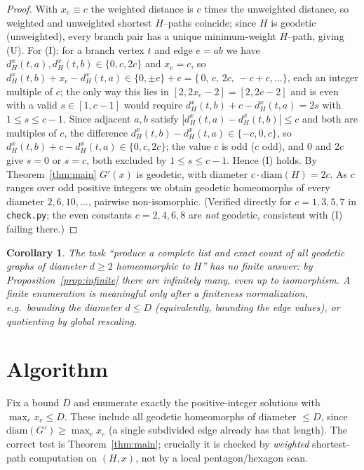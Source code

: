 \documentclass{amsart}
\newtheorem{corollary}{Corollary}
\theoremstyle{definition}
\begin{document}
\begin{proof}
With $x_e\equiv c$ the weighted distance is $c$ times the unweighted distance, so
weighted and unweighted shortest $H$--paths coincide; since $H$ is geodetic
(unweighted), every branch pair has a unique minimum-weight $H$--path, giving
(U). For (I): for a branch vertex $t$ and edge $e=ab$ we have
$d^x_H(t,a),d^x_H(t,b)\in\{0,c,2c\}$ and $x_e=c$, so
$d^x_H(t,b)+x_e-d^x_H(t,a)\in\{0,\pm c\}+c=\{\,0,\,c,\,2c,\,-c+ c,\dots\}$, each
an integer multiple of $c$; the only way this lies in $[2,2x_e-2]=[2,2c-2]$ and
is even with a valid $s\in[1,c-1]$ would require $d^x_H(t,b)+c-d^x_H(t,a)=2s$ with
$1\le s\le c-1$. Since adjacent $a,b$ satisfy $|d^x_H(t,a)-d^x_H(t,b)|\le c$ and
both are multiples of $c$, the difference $d^x_H(t,b)-d^x_H(t,a)\in\{-c,0,c\}$, so
$d^x_H(t,b)+c-d^x_H(t,a)\in\{0,c,2c\}$; the value $c$ is odd ($c$ odd), and $0$
and $2c$ give $s=0$ or $s=c$, both excluded by $1\le s\le c-1$. Hence (I) holds.
By Theorem~\ref{thm:main} $G'(x)$ is geodetic, with diameter
$c\cdot\mathrm{diam}(H)=2c$. As $c$ ranges over odd positive integers we obtain
geodetic homeomorphs of every diameter $2,6,10,\dots$, pairwise non-isomorphic.
(Verified directly for $c=1,3,5,7$ in \texttt{check.py}; the even constants
$c=2,4,6,8$ are \emph{not} geodetic, consistent with (I) failing there.)
\end{proof}

\begin{corollary}\label{cor:illposed}
The task ``produce a complete list and exact \emph{count} of all geodetic graphs
of diameter $d\ge2$ homeomorphic to $H$'' has no finite answer: by
Proposition~\ref{prop:infinite} there are infinitely many, even up to
isomorphism. A finite enumeration is meaningful only after a finiteness
normalization, e.g.\ bounding the diameter $d\le D$ (equivalently, bounding the
edge values), or quotienting by global rescaling.
\end{corollary}

\section{Algorithm}

Fix a bound $D$ and enumerate exactly the positive-integer solutions with
$\max_e x_e\le D$. These include all geodetic homeomorphs of diameter $\le D$,
since $\mathrm{diam}(G')\ge\max_e x_e$ (a single subdivided edge already has that
length). The correct test is Theorem~\ref{thm:main}; crucially it is checked by
\emph{weighted} shortest-path computation on $(H,x)$, not by a local
pentagon/hexagon scan.
\end{document}
